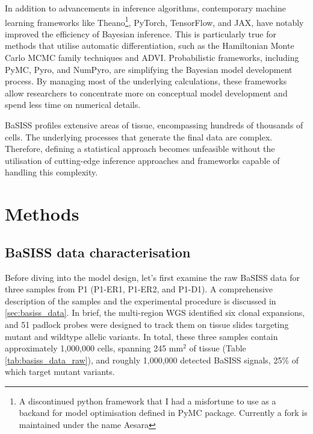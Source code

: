 In addition to advancements in inference algorithms, contemporary machine learning frameworks like \ac{Theano}\footnote{A discontinued python framework that I had a misfortune to use as a backand for model optimisation defined in PyMC package. Currently a fork is maintained under the name Aesara}, \ac{PyTorch}, \ac{TensorFlow}, and \ac{JAX}, have notably improved the efficiency of Bayesian inference. This is particularly true for methods that utilise automatic differentiation, such as the Hamiltonian Monte Carlo \ac{MCMC} family techniques and \ac{ADVI}. Probabilistic frameworks, including \ac{PyMC}, \ac{Pyro}, and \ac{NumPyro}, are simplifying the Bayesian model development process. By managing most of the underlying calculations, these frameworks allow researchers to concentrate more on conceptual model development and spend less time on numerical details.

\ac{BaSISS} profiles extensive areas of tissue, encompassing hundreds of thousands of cells. The underlying processes that generate the final data are complex. Therefore, defining a statistical approach becomes unfeasible without the utilisation of cutting-edge inference approaches and frameworks capable of handling this complexity.

\section{Methods}
\subsection{BaSISS data characterisation}
\label{sec:bassis-data-brief}

Before diving into the model design, let's first examine the raw \ac{BaSISS} data for three samples from P1 (P1-ER1, P1-ER2, and P1-D1). A comprehensive description of the samples and the experimental procedure is discussed in \cref{sec:basiss_data}. In brief, the multi-region \ac{WGS} identified six clonal expansions, and 51 padlock probes were designed to track them on tissue slides targeting mutant and wildtype allelic variants. In total, these three samples contain approximately 1,000,000 cells, spanning 245 mm\(^2\) of tissue (Table \cref{tab:basiss_data_raw}), and roughly 1,000,000 detected \ac{BaSISS} signals, 25\% of which target mutant variants.

